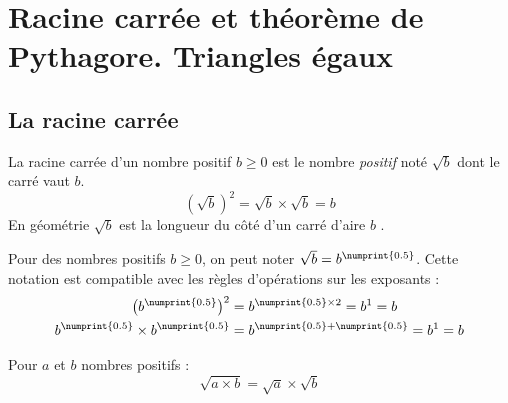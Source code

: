 \documentclass[main.tex]{subfiles}
\begin{document}
 
\cleardoublepage 
{}  
\pagestyle{scrheadings} %
\onehalfspacing 
\setcounter{chapter}{4}
\chapter{Racine carrée et théorème de Pythagore. Triangles égaux}


\section{La racine carrée}
\begin{definition}
	La racine carrée d'un nombre positif $b\geqslant 0$  est le nombre \emph{positif} noté $\sqrt{b}$ dont le carré vaut $b$. 
	$$
	\left(\sqrt{b}\right)^2=\sqrt{b}\times\sqrt{b} = b $$
	En géométrie $\sqrt{b}$ est \og la longueur du côté d'un carré d'aire  $b$ \fg{}.
\end{definition}
\begin{remark}
	Pour des nombres positifs $b\geqslant 0$, on peut noter $\sqrt{b}=b^{\numprint{0.5}}$. Cette notation est compatible avec les règles d'opérations sur les exposants :
	\begin{align*}
		\big( b^{\numprint{0.5}}\big)^2 & = b^{\numprint{0.5}\times 2} = b^1= b\\
		b^{\numprint{0.5}} \times  b^{\numprint{0.5}} & = b^{\numprint{0.5}+\numprint{0.5}} = b^1 = b
	\end{align*} 
\end{remark}
\begin{theorem} Pour $a$ et $b$ nombres positifs :
	$$\sqrt{a\times b}=\sqrt{a}\times \sqrt{b}$$
\end{theorem}




\newpage 
{}  
\pagestyle{scrheadings} %
\onehalfspacing
\end{document}
